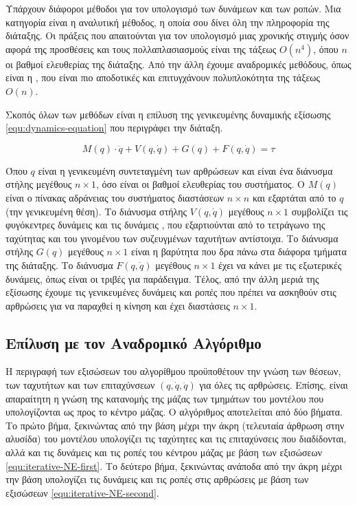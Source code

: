 Υπάρχουν διάφοροι μέθοδοι για τον υπολογισμό των δυνάμεων και των ροπών. Μια κατηγορία είναι η αναλυτική μέθοδος, η οποία σου δίνει όλη την πληροφορία της διάταξης. Οι πράξεις που απαιτούνται για τον υπολογισμό μιας χρονικής στιγμής όσον αφορά της προσθέσεις και τους πολλαπλασιασμούς είναι της τάξεως $O(n^4)$, όπου $n$ οι βαθμοί ελευθερίας της διάταξης. Από την άλλη έχουμε αναδρομικές μεθόδους, όπως είναι η , που είναι πιο αποδοτικές και επιτυγχάνουν πολυπλοκότητα της τάξεως $O(n)$.

Σκοπός όλων των μεθόδων είναι η επίλυση της γενικευμένης δυναμικής εξίσωσης \ref{equ:dynamics-equation} που περιγράφει την διάταξη.

\begin{equation}
    M(q) \cdot \ddot{q} + V(q, \dot{q}) + G(q) + F(q, \dot{q}) = \tau
    \label{equ:dynamics-equation}
\end{equation}

Όπου $q$ είναι η γενικευμένη συντεταγμένη των αρθρώσεων και είναι ένα διάνυσμα στήλης μεγέθους $n \times 1$, όσο είναι οι βαθμοί ελευθερίας του συστήματος. Ο $M(q)$ είναι ο πίνακας αδράνειας του συστήματος διαστάσεων $n \times n$ και εξαρτάται από το $q$ (την γενικευμένη θέση). Το διάνυσμα στήλης $V(q, \dot{q})$ μεγέθους $n \times 1$ συμβολίζει τις φυγόκεντρες δυνάμεις και τις δυνάμεις , που εξαρτιούνται από το τετράγωνο της ταχύτητας και του γινομένου των συζευγμένων ταχυτήτων αντίστοιχα. Το διάνυσμα στήλης $G(q)$ μεγέθους $n \times 1$ είναι η βαρύτητα που δρα πάνω στα διάφορα τμήματα της διάταξης. Το διάνυσμα $F(q, \dot{q})$ μεγέθους $n \times 1$ έχει να κάνει με τις εξωτερικές δυνάμεις, όπως είναι οι τριβές για παράδειγμα. Τέλος, από την άλλη μεριά της εξίσωσης έχουμε τις γενικευμένες δυνάμεις και ροπές που πρέπει να ασκηθούν στις αρθρώσεις για να παραχθεί η κίνηση και έχει διαστάσεις $n \times 1$.

\subsection{Επίλυση με τον Αναδρομικό Αλγόριθμο}

Η περιγραφή των εξισώσεων του αλγορίθμου  προϋποθέτουν την γνώση των θέσεων, των ταχυτήτων και των επιταχύνσεων $(q, \dot{q}, \ddot{q})$ για όλες τις αρθρώσεις. Επίσης, είναι απαραίτητη η γνώση της κατανομής της μάζας των τμημάτων του μοντέλου που υπολογίζονται ως προς το κέντρο μάζας. Ο αλγόριθμος αποτελείται από δύο βήματα. Το πρώτο βήμα, ξεκινώντας από την βάση μέχρι την άκρη (τελευταία άρθρωση στην αλυσίδα) του μοντέλου υπολογίζει τις ταχύτητες και τις επιταχύνσεις που διαδίδονται, αλλά και τις δυνάμεις και τις ροπές του κέντρου μάζας με βάση των εξισώσεων \ref{equ:iterative-NE-first}. Το δεύτερο βήμα, ξεκινώντας ανάποδα από την άκρη μέχρι την βάση υπολογίζει τις δυνάμεις και τις ροπές στις αρθρώσεις με βάση των εξισώσεων \ref{equ:iterative-NE-second}.

